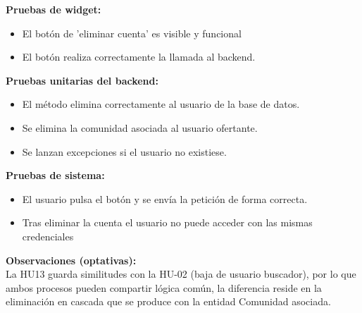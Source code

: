 \begin{tarjetaHU}
\vspace{0.5em}
\textbf{Pruebas de widget:}
\begin{itemize}[left=0pt]
  \item El botón de 'eliminar cuenta' es visible y funcional
  \item El botón realiza correctamente la llamada al backend.
\end{itemize}
\textbf{Pruebas unitarias del backend:}
\begin{itemize}[left=0pt]
  \item El método elimina correctamente al usuario de la base de datos.
  \item Se elimina la comunidad asociada al usuario ofertante.
  \item Se lanzan excepciones si el usuario no existiese.
\end{itemize}
\textbf{Pruebas de sistema:}
\begin{itemize}[left=0pt]
    \item El usuario pulsa el botón y se envía la petición de forma correcta.
    \item Tras eliminar la cuenta el usuario no puede acceder con las mismas credenciales
\end{itemize}
\vspace{0.5em}
\textbf{Observaciones (optativas):} \\
La HU13 guarda similitudes con la HU-02 (baja de usuario buscador), por lo que ambos procesos pueden compartir lógica común, la diferencia reside en la eliminación en cascada que se produce con la entidad Comunidad asociada.

\end{tarjetaHU}

